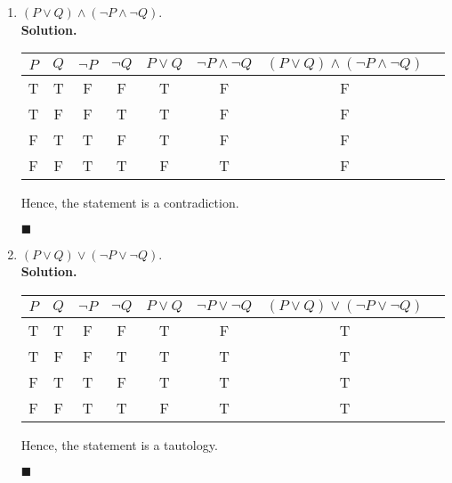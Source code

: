 \documentclass{report}
\newcommand{\sol}{\vspace{1em}\\\textbf{Solution.}\vspace{0.5em}}
\newcommand{\qed}{\ \\\strut\hfill$\blacksquare$\vspace{1em}}
\begin{document}
\begin{enumerate}[leftmargin=*]
\begin{enumerate}
              \item $(P \vee Q) \wedge(\neg P \wedge \neg Q)$.
                    \sol{}
                    \begin{center}
                        \begin{tabular}{cccccccc}
                            $P$ & $Q$ & $\neg P$ & $\neg Q$ & $P \vee Q$ & $\neg P \wedge \neg Q$ & $(P \vee Q) \wedge(\neg P \wedge \neg Q)$ \\
                            \hline
                            T   & T   & F        & F        & T          & F                      & F                                         \\
                            T   & F   & F        & T        & T          & F                      & F                                         \\
                            F   & T   & T        & F        & T          & F                      & F                                         \\
                            F   & F   & T        & T        & F          & T                      & F
                        \end{tabular}
                    \end{center}
                    Hence, the statement is a contradiction.\qed

              \item $(P \vee Q) \vee(\neg P \vee \neg Q)$.
                    \sol{}
                    \begin{center}
                        \begin{tabular}{cccccccc}
                            $P$ & $Q$ & $\neg P$ & $\neg Q$ & $P \vee Q$ & $\neg P \vee \neg Q$ & $(P \vee Q) \vee(\neg P \vee \neg Q)$ \\
                            \hline
                            T   & T   & F        & F        & T          & F                    & T                                     \\
                            T   & F   & F        & T        & T          & T                    & T                                     \\
                            F   & T   & T        & F        & T          & T                    & T                                     \\
                            F   & F   & T        & T        & F          & T                    & T
                        \end{tabular}
                    \end{center}
                    Hence, the statement is a tautology.\qed


\end{enumerate}
\end{enumerate}
\end{document}
